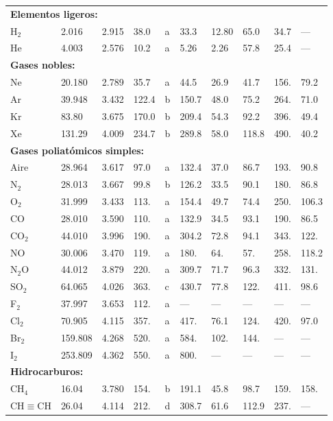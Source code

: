 \begin{landscape}
\begin{longtable}{p{2.6cm}p{1.3cm}|p{1.5cm}p{1.5cm}p{0.5cm}|p{1.5cm}p{1.5cm}p{1.5cm}|p{2cm}p{1.8cm}}
\multicolumn{10}{l}{\textbf{Elementos ligeros:}} \\
H$_2$ & 2.016 & 2.915 & 38.0 & a & 33.3 & 12.80 & 65.0 & 34.7 & — \\
He & 4.003 & 2.576 & 10.2 & a & 5.26 & 2.26 & 57.8 & 25.4 & — \\
\midrule
\multicolumn{10}{l}{\textbf{Gases nobles:}} \\
Ne & 20.180 & 2.789 & 35.7 & a & 44.5 & 26.9 & 41.7 & 156. & 79.2 \\
Ar & 39.948 & 3.432 & 122.4 & b & 150.7 & 48.0 & 75.2 & 264. & 71.0 \\
Kr & 83.80 & 3.675 & 170.0 & b & 209.4 & 54.3 & 92.2 & 396. & 49.4 \\
Xe & 131.29 & 4.009 & 234.7 & b & 289.8 & 58.0 & 118.8 & 490. & 40.2 \\
\midrule
\multicolumn{10}{l}{\textbf{Gases poliatómicos simples:}} \\
Aire & 28.964 & 3.617 & 97.0 & a & 132.4 & 37.0 & 86.7 & 193. & 90.8 \\
N$_2$ & 28.013 & 3.667 & 99.8 & b & 126.2 & 33.5 & 90.1 & 180. & 86.8 \\
O$_2$ & 31.999 & 3.433 & 113. & a & 154.4 & 49.7 & 74.4 & 250. & 106.3 \\
CO & 28.010 & 3.590 & 110. & a & 132.9 & 34.5 & 93.1 & 190. & 86.5 \\
CO$_2$ & 44.010 & 3.996 & 190. & a & 304.2 & 72.8 & 94.1 & 343. & 122. \\
NO & 30.006 & 3.470 & 119. & a & 180. & 64. & 57. & 258. & 118.2 \\
N$_2$O & 44.012 & 3.879 & 220. & a & 309.7 & 71.7 & 96.3 & 332. & 131. \\
SO$_2$ & 64.065 & 4.026 & 363. & c & 430.7 & 77.8 & 122. & 411. & 98.6 \\
F$_2$ & 37.997 & 3.653 & 112. & a & — & — & — & — & — \\
Cl$_2$ & 70.905 & 4.115 & 357. & a & 417. & 76.1 & 124. & 420. & 97.0 \\
Br$_2$ & 159.808 & 4.268 & 520. & a & 584. & 102. & 144. & — & — \\
I$_2$ & 253.809 & 4.362 & 550. & a & 800. & — & — & — & — \\
\midrule
\multicolumn{10}{l}{\textbf{Hidrocarburos:}} \\
CH$_4$ & 16.04 & 3.780 & 154. & b & 191.1 & 45.8 & 98.7 & 159. & 158. \\
$\mathrm{CH} \equiv \mathrm{CH}$ & 26.04 & 4.114 & 212. & d & 308.7 & 61.6 & 112.9 & 237. & — \\

\end{longtable}
\end{landscape}
